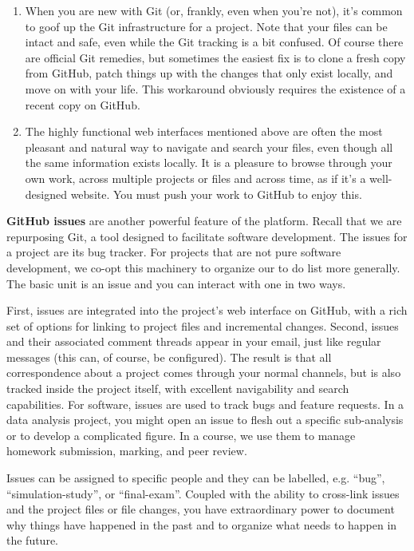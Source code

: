\documentclass[12pt]{article}
\begin{document}
\begin{enumerate}
\def\labelenumi{\arabic{enumi}.}
\item
  When you are new with Git (or, frankly, even when you're not), it's
  common to goof up the Git infrastructure for a project. Note that your
  files can be intact and safe, even while the Git tracking is a bit
  confused. Of course there are official Git remedies, but sometimes the
  easiest fix is to clone a fresh copy from GitHub, patch things up with
  the changes that only exist locally, and move on with your life. This
  workaround obviously requires the existence of a recent copy on
  GitHub.
\item
  The highly functional web interfaces mentioned above are often the
  most pleasant and natural way to navigate and search your files, even
  though all the same information exists locally. It is a pleasure to
  browse through your own work, across multiple projects or files and
  across time, as if it's a well-designed website. You must push your
  work to GitHub to enjoy this.
\end{enumerate}

\textbf{GitHub issues} are another powerful feature of the platform.
Recall that we are repurposing Git, a tool designed to facilitate
software development. The issues for a project are its bug tracker. For
projects that are not pure software development, we co-opt this
machinery to organize our to do list more generally. The basic unit is
an issue and you can interact with one in two ways.

First, issues are integrated into the project's web interface on GitHub,
with a rich set of options for linking to project files and incremental
changes. Second, issues and their associated comment threads appear in
your email, just like regular messages (this can, of course, be
configured). The result is that all correspondence about a project comes
through your normal channels, but is also tracked inside the project
itself, with excellent navigability and search capabilities. For
software, issues are used to track bugs and feature requests. In a data
analysis project, you might open an issue to flesh out a specific
sub-analysis or to develop a complicated figure. In a course, we use
them to manage homework submission, marking, and peer review.

Issues can be assigned to specific people and they can be labelled, e.g.
``bug'', ``simulation-study'', or ``final-exam''. Coupled with the
ability to cross-link issues and the project files or file changes, you
have extraordinary power to document why things have happened in the
past and to organize what needs to happen in the future.
\end{document}
